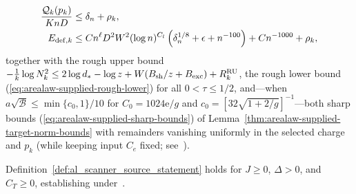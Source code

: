 \begin{definition}
\begin{enumerate}
              \begin{align}
                  \frac{\mathcal Q_k(p_k)}{KnD} & \le\delta_n+\rho_k,\notag        \\
                  E_{{\rm def},k}               & \le Cn^\ell D^2W^2(\log n)^{C_l}
                  \left(\delta_n^{1/8}+\epsilon+n^{-100}\right)
                  +Cn^{-1000}+\rho_k,
                  \label{eq:al_scanner_source_energy}
              \end{align}
              together with the rough upper bound $-\frac{1}{k}\log N_k^2\le2\log d_*-\log z+W(B_{\rm sh}/z+B_{\rm exc})+R_k^{\rm RU}$, the rough lower bound (\ref{eq:arealaw-supplied-rough-lower}) for all $0<\tau\le1/2$, and—when $a\sqrt{\mathcal B}\le\min\{c_0,1\}/10$ for $C_0=1024\mathrm e/g$ and $c_0=[32\sqrt{1+2/g}]^{-1}$—both sharp bounds (\ref{eq:arealaw-supplied-sharp-bounds}) of Lemma~\ref{thm:arealaw-supplied-target-norm-bounds} with remainders vanishing uniformly in the selected charge and $p_k$ (while keeping input $C_e$ fixed; see~\cite{gap:arealaw2d_scanner_inputs}).
    \end{enumerate}
\end{definition}

\begin{lemma}
    \label{thm:al_scanner_source}
    \leanok
    Definition~\ref{def:al_scanner_source_statement} holds for $J\ge0$, $\Delta>0$, and $C_T\ge0$, establishing \cite[Proposition~9.2]{OpenAI2026AreaLaw} under~\cite{gap:arealaw2d_scanner_inputs}.
\end{lemma}

